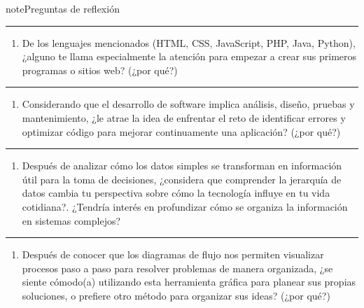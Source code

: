 \documentclass[letterpaper,10pt,spanish]{sphinxmanual}
\begin{document}
\begin{sphinxadmonition}{note}{Preguntas de reflexión}
\begin{enumerate}
\end{enumerate}


\bigskip\hrule\bigskip

\begin{enumerate}
%
\setcounter{enumi}{5}
\item {} 
\sphinxAtStartPar
De los lenguajes mencionados (HTML, CSS, JavaScript, PHP, Java, Python), ¿alguno te llama especialmente la atención para empezar a crear sus primeros programas o sitios web? (¿por qué?)

\end{enumerate}


\bigskip\hrule\bigskip

\begin{enumerate}
%
\setcounter{enumi}{6}
\item {} 
\sphinxAtStartPar
Considerando que el desarrollo de software implica análisis, diseño, pruebas y mantenimiento, ¿le atrae la idea de enfrentar el reto de identificar errores y optimizar código para mejorar continuamente una aplicación? (¿por qué?)

\end{enumerate}


\bigskip\hrule\bigskip

\begin{enumerate}
%
\setcounter{enumi}{7}
\item {} 
\sphinxAtStartPar
Después de analizar cómo los datos simples se transforman en información útil para la toma de decisiones, ¿considera que comprender la jerarquía de datos cambia tu perspectiva sobre cómo la tecnología influye en tu vida cotidiana?. ¿Tendría interés en profundizar cómo se organiza la información en sistemas complejos?

\end{enumerate}


\bigskip\hrule\bigskip

\begin{enumerate}
%
\setcounter{enumi}{8}
\item {} 
\sphinxAtStartPar
Después de conocer que los diagramas de flujo nos permiten visualizar procesos paso a paso para resolver problemas de manera organizada, ¿se siente cómodo(a) utilizando esta herramienta gráfica para planear sus propias soluciones, o prefiere otro método para organizar sus ideas? (¿por qué?)


\end{enumerate}
\end{sphinxadmonition}
\end{document}
